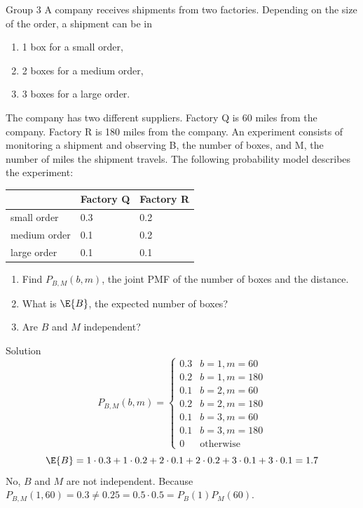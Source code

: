 \documentclass{article}
\theoremstyle{plain}
\theoremstyle{definition}
\theoremstyle{remark}
\begin{document}
\begin{problem}
    {Group 3}
    A company receives shipments from two factories. Depending on the size of the order, a shipment can be in
    \begin{enumerate}
        \item 1 box for a small order,
        \item 2 boxes for a medium order,
        \item 3 boxes for a large order.
    \end{enumerate}
    The company has two different suppliers. Factory Q is 60 miles from the company. Factory R is 180 miles from the company. An experiment consists of monitoring a shipment and observing B, the number of boxes, and M, the number of miles the shipment travels. The following probability model describes the experiment:
    \begin{table}[H]
        \centering
        \begin{tabular}{|l|l|l|}
        \hline
                     & Factory Q & Factory R \\ \hline
        small order  & 0.3       & 0.2       \\ \hline
        medium order & 0.1       & 0.2       \\ \hline
        large order  & 0.1       & 0.1       \\ \hline
        \end{tabular}
    \end{table}
    \begin{enumerate}
        \item Find $P_{B,M}(b,m)$, the joint PMF of the number of boxes and the distance.
        \item What is $\E{B}$, the expected number of boxes?
        \item Are $B$ and $M$ independent?
    \end{enumerate}
\end{problem}

\begin{solution}
    {Solution}
    \[
    P_{B,M}(b,m)={
        \begin{cases}
            0.3 & b=1, m=60\\
            0.2 & b=1, m=180\\
            0.1 & b=2, m=60\\
            0.2 & b=2, m=180\\
            0.1 & b=3, m=60\\
            0.1 & b=3, m=180\\
            0 & \text{otherwise}
        \end{cases}
    }
    \]
    \[
    \E{B}= 1\cdot 0.3+1\cdot 0.2+2\cdot 0.1+2\cdot 0.2+3\cdot 0.1+3\cdot 0.1=1.7
    \]
    No, $B$ and $M$ are not independent. Because $P_{B,M}(1,60)=0.3\neq 0.25=0.5\cdot 0.5=P_B(1)P_M(60)$.
\end{solution}
\end{document}
